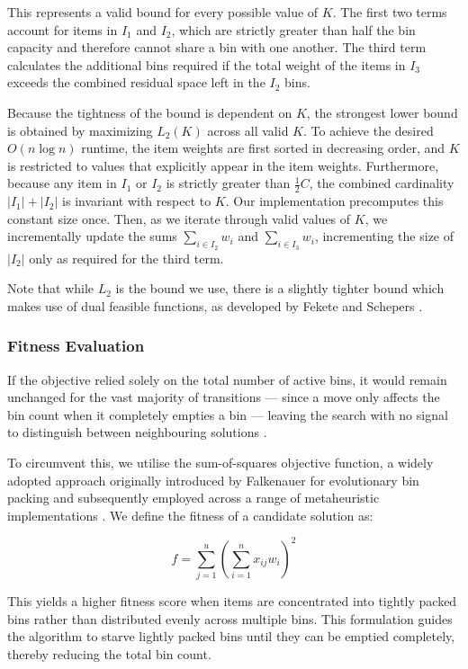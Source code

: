\documentclass[11pt]{article}
\begin{document}
This represents a valid bound for every possible value of $K$. The first two terms account for items in $I_1$ and $I_2$, which are strictly greater than half the bin capacity and therefore cannot share a bin with one another. The third term calculates the additional bins required if the total weight of the items in $I_3$ exceeds the combined residual space left in the $I_2$ bins. 

Because the tightness of the bound is dependent on $K$, the strongest lower bound is obtained by maximizing $L_2(K)$ across all valid $K$. To achieve the desired $O(n \log n)$ runtime, the item weights are first sorted in decreasing order, and $K$ is restricted to values that explicitly appear in the item weights. Furthermore, because any item in $I_1$ or $I_2$ is strictly greater than $\frac{1}{2}C$, the combined cardinality $|I_1| + |I_2|$ is invariant with respect to $K$. Our implementation precomputes this constant size once. Then, as we iterate through valid values of $K$, we incrementally update the sums $\sum_{i \in I_2} w_i$ and $\sum_{i \in I_3} w_i$, incrementing the size of $|I_2|$ only as required for the third term. 

Note that while $L_2$ is the bound we use, there is a slightly tighter bound which makes use of dual feasible functions, as developed by Fekete and Schepers \cite{fekete}.

\subsubsection{Fitness Evaluation}

If the objective relied solely on the total number of active bins, it would remain unchanged for the vast majority of transitions — since a move only affects the bin count when it completely empties a bin — leaving the search with no signal to distinguish between neighbouring solutions \cite{gga}.

To circumvent this, we utilise the sum-of-squares objective function, a widely adopted approach originally introduced by Falkenauer for evolutionary bin packing \cite{gga} and subsequently employed across a range of metaheuristic implementations \cite{sonuc, kryz}. We define the fitness of a candidate solution as:

$$ f = \sum_{j=1}^{u} \left( {\sum_{i=1}^{n} x_{ij} w_{i}} \right)^2 $$

This yields a higher fitness score when items are concentrated into tightly packed bins rather than distributed evenly across multiple bins. This formulation guides the algorithm to starve lightly packed bins until they can be emptied completely, thereby reducing the total bin count.
\end{document}
